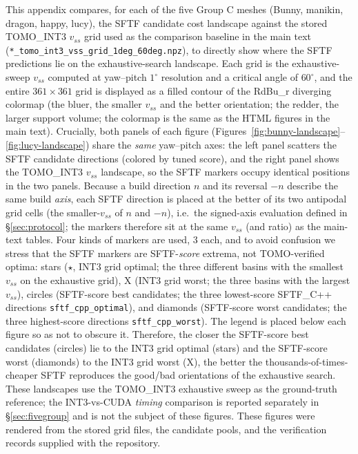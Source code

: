 \documentclass[11pt,a4paper]{article}
\begin{document}
This appendix compares, for each of the five Group C meshes (Bunny, manikin, dragon, happy, lucy), the SFTF candidate cost landscape against the stored TOMO\_INT3 $v_{ss}$ grid used as the comparison baseline in the main text
(\texttt{*\_tomo\_int3\_vss\_grid\_1deg\_60deg.npz}),
to directly show where the SFTF predictions lie on the exhaustive-search landscape.
Each grid is the exhaustive-sweep $v_{ss}$ computed at yaw--pitch $1^\circ$ resolution and a critical angle of $60^\circ$,
and the entire $361\times361$ grid is displayed as a filled contour of the RdBu\_r diverging colormap
(the bluer, the smaller $v_{ss}$ and the better orientation; the redder, the larger support volume; the colormap is the same as the HTML figures in the main text).
Crucially, both panels of each figure (Figures~\ref{fig:bunny-landscape}--\ref{fig:lucy-landscape}) share the \emph{same} yaw--pitch axes:
the left panel scatters the SFTF candidate directions (colored by tuned score), and the right panel shows the TOMO\_INT3 $v_{ss}$ landscape,
so the SFTF markers occupy identical positions in the two panels.
Because a build direction $n$ and its reversal $-n$ describe the same build \emph{axis}, each SFTF direction is placed at the better of its two antipodal grid cells
(the smaller-$v_{ss}$ of $n$ and $-n$), i.e.\ the signed-axis evaluation defined in \S\ref{sec:protocol}; the markers therefore sit at the same $v_{ss}$ (and ratio) as the main-text tables.
Four kinds of markers are used, 3 each, and to avoid confusion we stress that the SFTF markers are SFTF-\emph{score} extrema, not TOMO-verified optima:
stars ($\star$, INT3 grid optimal; the three different basins with the smallest $v_{ss}$ on the exhaustive grid),
X (INT3 grid worst; the three basins with the largest $v_{ss}$), circles (SFTF-score best candidates; the three lowest-score SFTF\_C++ directions \texttt{sftf\_cpp\_optimal}),
and diamonds (SFTF-score worst candidates; the three highest-score directions \texttt{sftf\_cpp\_worst}).
The legend is placed below each figure so as not to obscure it.
Therefore, the closer the SFTF-score best candidates (circles) lie to the INT3 grid optimal (stars) and the SFTF-score worst (diamonds) to the INT3 grid worst (X),
the better the thousands-of-times-cheaper SFTF reproduces the good/bad orientations of the exhaustive search.
These landscapes use the TOMO\_INT3 exhaustive sweep as the ground-truth reference; the INT3-vs-CUDA \emph{timing} comparison is reported separately in \S\ref{sec:fivegroup} and is not the subject of these figures.
These figures were rendered from the stored grid files, the candidate pools, and the verification records supplied with the repository.
\end{document}
